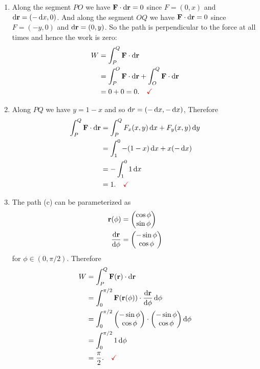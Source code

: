 \begin{enumerate}[label=(\alph*)]
\item Along the segment $PO$ we have $\F \cdot \d\r = 0$ since $F = (0, x)$ and $\d\r = (-\dx,
  0)$. And along the segment $OQ$ we have $\F \cdot \d\r = 0$ since $F = (-y, 0)$ and
  $\d\r = (0, y)$. So the path is perpendicular to the force at all times and hence the work is
  zero:
  \begin{align*}
    W
    &= \int_P^Q \F \cdot \d\r \\
    &= \int_P^O \F \cdot \d\r + \int_O^Q \F \cdot \d\r \\
    &= 0 + 0 = 0. ~~~\red{\checkmark}
  \end{align*}
\item Along $PQ$ we have $y = 1 - x$ and so $\dr = (-\dx, -\dx)$, Therefore
  \begin{align*}
    \int_P^Q \F \cdot \d\r
    &= \int_P^Q F_x(x, y)\dx + F_y(x, y)\dy \\
    &= \int_1^0 -(1-x)\dx + x(-\dx) \\
    &= -\int_1^0 1 \dx \\
    &= 1. ~~~\red{\checkmark}
  \end{align*}
\item The path (c) can be parameterized as
  \begin{align*}
    \r(\phi)            &= \vecMM{\cos \phi}{\sin \phi} \\
    \frac{\d\r}{\d\phi} &= \vecMM{-\sin\phi}{\cos\phi}
  \end{align*}
  for $\phi \in (0, \pi/2)$. Therefore
  \begin{align*}
    W
    &= \int_P^Q \F(\r) \cdot \d\r \\
    &= \int_0^{\pi/2} \F(\r(\phi)) \cdot \frac{\d\r}{\d\phi} \d\phi \\
    &= \int_0^{\pi/2} \vecMM{-\sin\phi}{\cos\phi} \cdot \vecMM{-\sin\phi}{\cos\phi} \d\phi \\
    &= \int_0^{\pi/2} 1 \d\phi \\
    &= \frac{\pi}{2}. ~~~\red{\checkmark}
  \end{align*}
\end{enumerate}
